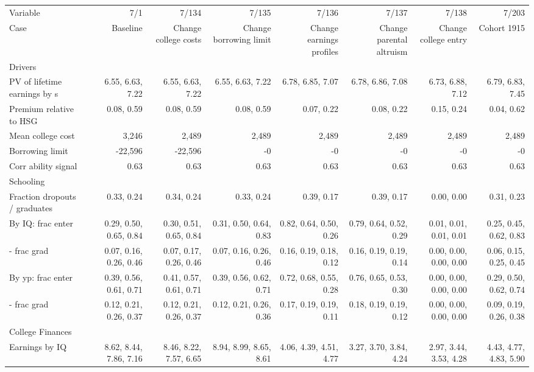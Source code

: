 \begin{tabular}{lrrrrrrr}
\hline
Variable & 7/1  & 7/134  & 7/135  & 7/136  & 7/137  & 7/138  & 7/203  \\ 
Case & Baseline  & Change college costs  & Change borrowing limit  & Change earnings profiles  & Change parental altruism  & Change college entry  & Cohort 1915  \\ 
Drivers &   &   &   &   &   &   &   \\ 
PV of lifetime earnings by s & 6.55, 6.63, 7.22  & 6.55, 6.63, 7.22  & 6.55, 6.63, 7.22  & 6.78, 6.85, 7.07  & 6.78, 6.86, 7.08  & 6.73, 6.88, 7.12  & 6.79, 6.83, 7.45  \\ 
Premium relative to HSG & 0.08, 0.59  & 0.08, 0.59  & 0.08, 0.59  & 0.07, 0.22  & 0.08, 0.22  & 0.15, 0.24  & 0.04, 0.62  \\ 
Mean college cost & 3,246  & 2,489  & 2,489  & 2,489  & 2,489  & 2,489  & 2,489  \\ 
Borrowing limit & -22,596  & -22,596  & -0  & -0  & -0  & -0  & -0  \\ 
Corr ability signal & 0.63  & 0.63  & 0.63  & 0.63  & 0.63  & 0.63  & 0.63  \\ 
\hline
Schooling &   &   &   &   &   &   &   \\ 
Fraction dropouts / graduates & 0.33, 0.24  & 0.34, 0.24  & 0.33, 0.24  & 0.39, 0.17  & 0.39, 0.17  & 0.00, 0.00  & 0.31, 0.23  \\ 
By IQ: frac enter & 0.29, 0.50, 0.65, 0.84  & 0.30, 0.51, 0.65, 0.84  & 0.31, 0.50, 0.64, 0.83  & 0.82, 0.64, 0.50, 0.26  & 0.79, 0.64, 0.52, 0.29  & 0.01, 0.01, 0.01, 0.01  & 0.25, 0.45, 0.62, 0.83  \\ 
- frac grad & 0.07, 0.16, 0.26, 0.46  & 0.07, 0.17, 0.26, 0.46  & 0.07, 0.16, 0.26, 0.46  & 0.16, 0.19, 0.18, 0.12  & 0.16, 0.19, 0.19, 0.14  & 0.00, 0.00, 0.00, 0.00  & 0.06, 0.15, 0.25, 0.45  \\ 
By yp: frac enter & 0.39, 0.56, 0.61, 0.71  & 0.41, 0.57, 0.61, 0.71  & 0.39, 0.56, 0.62, 0.71  & 0.72, 0.68, 0.55, 0.28  & 0.76, 0.65, 0.53, 0.30  & 0.00, 0.00, 0.00, 0.00  & 0.29, 0.50, 0.62, 0.74  \\ 
- frac grad & 0.12, 0.21, 0.26, 0.37  & 0.12, 0.21, 0.26, 0.37  & 0.12, 0.21, 0.26, 0.36  & 0.17, 0.19, 0.19, 0.11  & 0.18, 0.19, 0.19, 0.12  & 0.00, 0.00, 0.00, 0.00  & 0.09, 0.19, 0.26, 0.38  \\ 
\hline
College Finances &   &   &   &   &   &   &   \\ 
Earnings by IQ & 8.62, 8.44, 7.86, 7.16  & 8.46, 8.22, 7.57, 6.65  & 8.94, 8.99, 8.65, 8.61  & 4.06, 4.39, 4.51, 4.77  & 3.27, 3.70, 3.84, 4.24  & 2.97, 3.44, 3.53, 4.28  & 4.43, 4.77, 4.83, 5.90  \\ 

\end{tabular}

